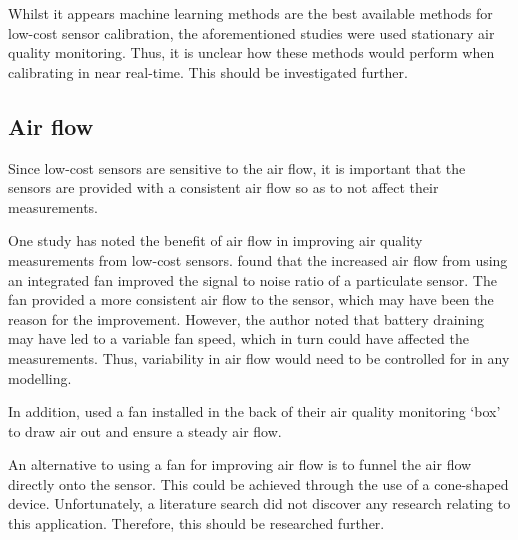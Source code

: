 \documentclass[11pt]{report}
\begin{document}
Whilst it appears machine learning methods are the best available methods for low-cost sensor calibration, the aforementioned studies were used stationary air quality monitoring. Thus, it is unclear how these methods would perform when calibrating in near real-time. This should be investigated further.



\subsection{Air flow} \label{air_flow}

Since low-cost sensors are sensitive to the air flow, it is important that the sensors are provided with a consistent air flow so as to not affect their measurements.

One study has noted the benefit of air flow in improving air quality measurements from low-cost sensors. \cite{thorpe2017RPimesh} found that the increased air flow from using an integrated fan improved the signal to noise ratio of a particulate sensor. The fan provided a more consistent air flow to the sensor, which may have been the reason for the improvement. However, the author noted that battery draining may have led to a variable fan speed, which in turn could have affected the measurements. Thus, variability in air flow would need to be controlled for in any modelling.

In addition, \cite{Hasenfratz2015highresmapsTram} used a fan installed in the back of their air quality monitoring `box' to draw air out and ensure a steady air flow.

An alternative to using a fan for improving air flow is to funnel the air flow directly onto the sensor. This could be achieved through the use of a cone-shaped device. Unfortunately, a literature search did not discover any research relating to this application. Therefore, this should be researched further.




\end{document}
